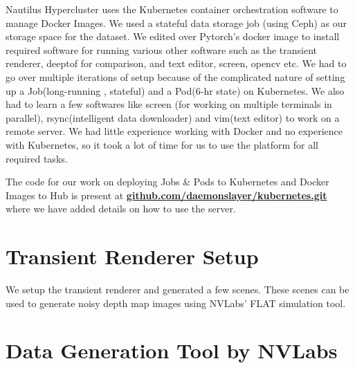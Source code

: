 \documentclass[runningheads]{llncs}
\begin{document}
Nautilus Hypercluster uses the Kubernetes container orchestration software to manage Docker Images. We used a stateful data storage job (using Ceph) as our storage space for the dataset. We edited over Pytorch's docker image to install required software for running various other software such as the transient renderer, deeptof for comparison, and text editor, screen, opencv etc. We had to go over multiple iterations of setup because of the complicated nature of setting up a Job(long-running , stateful) and a Pod(6-hr state) on Kubernetes. We also had to learn a few softwares like screen (for working on multiple terminals in parallel), rsync(intelligent data downloader) and vim(text editor) to work on a remote server. We had little experience working with Docker and no experience with Kubernetes, so it took a lot of time for us to use the platform for all required tasks.

The code for our work on deploying Jobs \& Pods to Kubernetes and Docker Images to Hub is present at
\href{https://www.github.com/daemonslayer/kubernetes.git}{\textbf{github.com/daemonslayer/kubernetes.git}} where we have added details on how to use the server.



\section{Transient Renderer Setup}

We setup the transient renderer and generated a few scenes. These scenes can be used to generate noisy depth map images using NVLabs' FLAT simulation tool.

\section{Data Generation Tool by NVLabs}
\end{document}

